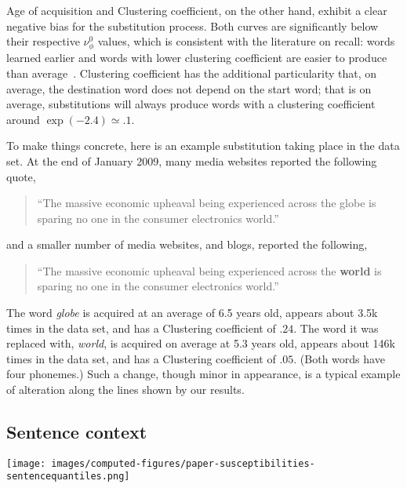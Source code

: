 Age of acquisition and Clustering coefficient, on the other hand, exhibit a clear negative bias for the substitution process. Both curves are significantly below their respective $\nu_{\phi}^0$ values, which is consistent with the literature on recall: words learned earlier and words with lower clustering coefficient are easier to produce than average~\citep{nelson2013activation,Zevin02}.
Clustering coefficient has the additional particularity that, on average, the destination word does not depend on the start word; that is on average, substitutions will always produce words with a clustering coefficient around $\exp(-2.4) \simeq .1$.

To make things concrete, here is an example substitution taking place in the data set.
At the end of January 2009, many media websites reported the following quote,

\begin{quote}
    ``The massive economic upheaval being experienced across the globe is sparing no one in the consumer electronics world.''
\end{quote}
and a smaller number of media websites, and blogs, reported the following,
\begin{quote}
    ``The massive economic upheaval being experienced across the \textbf{world} is sparing no one in the consumer electronics world.''
\end{quote}
The word \emph{globe} is acquired at an average of 6.5 years old, appears about 3.5k times in the data set, and has a Clustering coefficient of $.24$.
The word it was replaced with, \emph{world}, is acquired on average at 5.3 years old, appears about 146k times in the data set, and has a Clustering coefficient of $.05$. (Both words have four phonemes.)
Such a change, though minor in appearance, is a typical example of alteration along the lines shown by our results.


\subsection{Sentence context}


\begin{figure*}[!th]
    \centering
    \texttt{[image: images/computed-figures/paper-susceptibilities-sentencequantiles.png]}
    \caption{}
    \label{fig:feature-susceptibilities-in_sentence}
\end{figure*}

